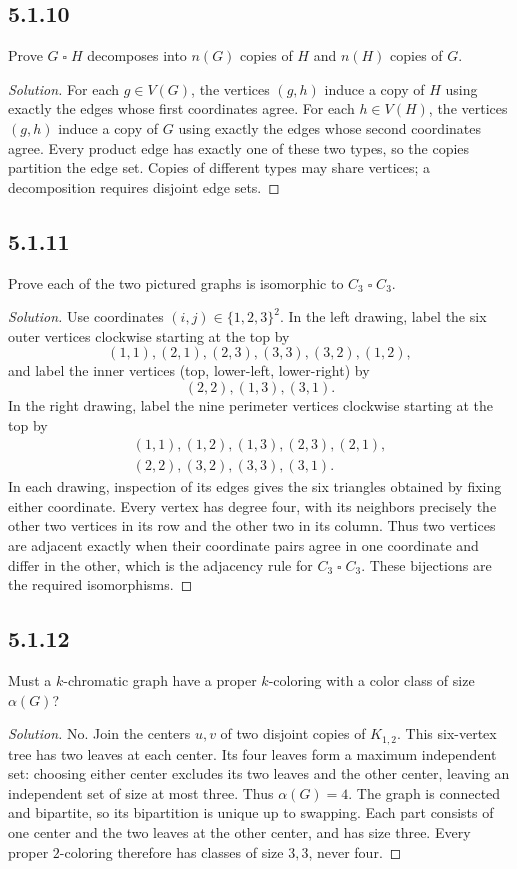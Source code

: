 \documentclass[12pt]{amsart}
\newenvironment{solution}{\begin{proof}[Solution]}{\end{proof}}
\newcommand{\cart}{\mathbin{\square}}
\begin{document}
    \subsection*{5.1.10} Prove $G\cart H$ decomposes into $n(G)$ copies of $H$ and $n(H)$ copies of $G$.
    \begin{solution}For each $g\in V(G)$, the vertices $(g,h)$ induce a copy of $H$ using exactly the edges whose first coordinates agree. For each $h\in V(H)$, the vertices $(g,h)$ induce a copy of $G$ using exactly the edges whose second coordinates agree. Every product edge has exactly one of these two types, so the copies partition the edge set. Copies of different types may share vertices; a decomposition requires disjoint edge sets.\end{solution}

    \subsection*{5.1.11} Prove each of the two pictured graphs is isomorphic to $C_3\cart C_3$.
    \begin{solution}Use coordinates $(i,j)\in\{1,2,3\}^2$. In the left drawing, label the six outer vertices clockwise starting at the top by
        \[
            (1,1),(2,1),(2,3),(3,3),(3,2),(1,2),
        \]
        and label the inner vertices (top, lower-left, lower-right) by
        \[
            (2,2),(1,3),(3,1).
        \]
        In the right drawing, label the nine perimeter vertices clockwise starting at the top by
        \[
            \begin{gathered}
                (1,1),(1,2),(1,3),(2,3),(2,1),\\
            (2,2),(3,2),(3,3),(3,1).
            \end{gathered}
        \]
        In each drawing, inspection of its edges gives the six triangles obtained by fixing either coordinate. Every vertex has degree four, with its neighbors precisely the other two vertices in its row and the other two in its column. Thus two vertices are adjacent exactly when their coordinate pairs agree in one coordinate and differ in the other, which is the adjacency rule for $C_3\cart C_3$. These bijections are the required isomorphisms.\end{solution}

    \subsection*{5.1.12} Must a $k$-chromatic graph have a proper $k$-coloring with a color class of size $\alpha(G)$?
    \begin{solution}No. Join the centers $u,v$ of two disjoint copies of $K_{1,2}$. This six-vertex tree has two leaves at each center. Its four leaves form a maximum independent set: choosing either center excludes its two leaves and the other center, leaving an independent set of size at most three. Thus $\alpha(G)=4$.
    The graph is connected and bipartite, so its bipartition is unique up to swapping. Each part consists of one center and the two leaves at the other center, and has size three. Every proper $2$-coloring therefore has classes of size $3,3$, never four.\end{solution}
\end{document}
